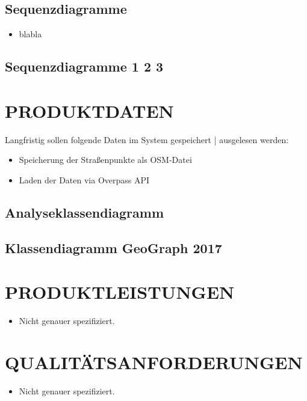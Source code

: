 	\subsection{Sequenzdiagramme}
	\begin{itemize}
		\item blabla
	\end{itemize}
	\subsection{Sequenzdiagramme 1 2 3}
	
	
	\section{\Large PRODUKTDATEN}
		Langfristig sollen folgende Daten im System gespeichert | ausgelesen werden:
	\begin{itemize}
		\item Speicherung der Straßenpunkte als OSM-Datei
		\item Laden der Daten via Overpass API
	\end{itemize}
	\subsection{Analyseklassendiagramm}
	\subsection{Klassendiagramm GeoGraph 2017}
	\section{\Large PRODUKTLEISTUNGEN}
	\begin{itemize}
		\item Nicht genauer spezifiziert.
	\end{itemize} 
		
	
	\section{\Large QUALITÄTSANFORDERUNGEN}
	\begin{itemize}
		\item Nicht genauer spezifiziert.
	\end{itemize}
	
